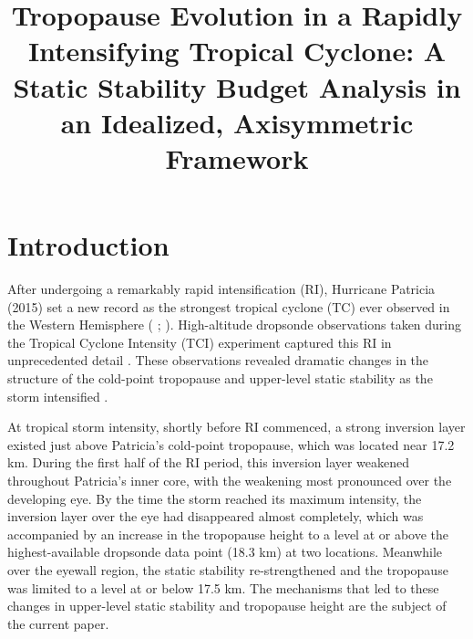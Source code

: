 \documentclass{ametsoc}
\title{Tropopause Evolution in a Rapidly Intensifying Tropical Cyclone: A Static Stability Budget Analysis in an Idealized, Axisymmetric Framework}
\affiliation{University at Albany, State University of New York,
Albany, NY}
\begin{document}
\maketitle


%

 \section{Introduction}


After undergoing a remarkably rapid intensification (RI), Hurricane Patricia (2015) set a new record as the strongest tropical cyclone (TC) ever observed in the Western Hemisphere (\citeauthor{Kimberlainetal2016} \citeyear{Kimberlainetal2016}; \citeauthor{Rogersetal2017} \citeyear{Rogersetal2017}).
High-altitude dropsonde observations taken during the Tropical Cyclone Intensity (TCI) experiment captured this RI in unprecedented detail \citep{DoyleTCI}.
These observations revealed dramatic changes in the structure of the cold-point tropopause and upper-level static stability as the storm intensified \citep{DuranMolinari2018}.

At tropical storm intensity, shortly before RI commenced, a strong inversion layer existed just above Patricia's cold-point tropopause, which was located near 17.2 km.
During the first half of the RI period, this inversion layer weakened throughout Patricia's inner core, with the weakening most pronounced over the developing eye.
By the time the storm reached its maximum intensity, the inversion layer over the eye had disappeared almost completely, which was accompanied by an increase in the tropopause height to a level at or above the highest-available dropsonde data point (18.3 km) at two locations.
Meanwhile over the eyewall region, the static stability re-strengthened and the tropopause was limited to a level at or below 17.5 km.
The mechanisms that led to these changes in upper-level static stability and tropopause height are the subject of the current paper.
\end{document}
